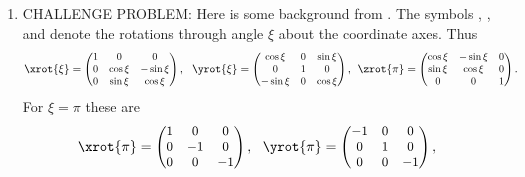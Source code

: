 \documentclass[11pt,titlepage,fleqn]{article}
\begin{document}
\begin{enumerate}
\item CHALLENGE PROBLEM: Here is some background from \citet{TapeTape2013}. The symbols \xrot{\xi}, \yrot{\xi}, and \zrot{\xi} denote the rotations through angle $\xi$ about the coordinate axes. Thus
%
\begin{equation*}
\xrot{\xi}=\begin{small}\begin{pmatrix}   1 &     0   & 0\\
                                          0 & \cos\xi &-\sin\xi\\
                                          0 & \sin\xi & \cos\xi\end{pmatrix}\end{small},\:\:\:
\yrot{\xi}=\begin{small}\begin{pmatrix}\cos\xi & 0 &\sin\xi \\
                                       0       & 1 & 0      \\
                                      -\sin\xi & 0 & \cos\xi\end{pmatrix}\end{small},\:\:
\zrot{\pi}=\begin{small}\begin{pmatrix}   \cos\xi & -\sin\xi & 0 \\
                                          \sin\xi & \cos\xi & 0 \\
                                          0  & 0 & 1\end{pmatrix}\end{small}.\:\:\:
\end{equation*}
%
For $\xi = \pi$ these are
%
\begin{equation*}
\xrot{\pi}=\begin{small}\begin{pmatrix}   1 &     0   & 0\\
                                          0 & -1 & 0\\
                                          0 & 0 & -1\end{pmatrix}\end{small},\:\:\:
\yrot{\pi}=\begin{small}\begin{pmatrix}-1 & 0 & 0 \\
                                       0 & 1 & 0      \\
                                       0 & 0 & -1\end{pmatrix}\end{small},\:\:\;

\end{equation*}
\end{enumerate}
\end{document}

